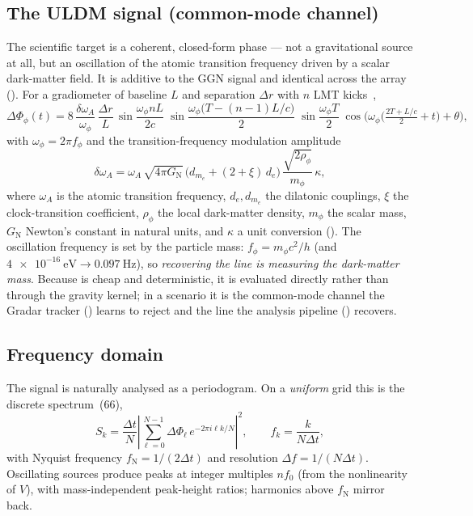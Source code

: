 \documentclass[11pt,a4paper]{article}
\theoremstyle{reqstyle}
\begin{document}
\subsection{The ULDM signal (common-mode channel)}
\label{sec:uldm}
The scientific target is a coherent, closed-form phase --- not a gravitational source at all,
but an oscillation of the atomic transition frequency driven by a scalar dark-matter field.
It is additive to the GGN signal and identical across the array (). For a
gradiometer of baseline $L$ and separation $\Delta r$ with $n$ LMT kicks~\cite{arvanitaki2015},
\begin{equation}
\Delta\Phi_\phi(t) = 8\,\frac{\delta\omega_A}{\omega_\phi}\,\frac{\Delta r}{L}\,
\sin\!\frac{\omega_\phi n L}{2c}\;
\sin\!\frac{\omega_\phi\big(T-(n{-}1)L/c\big)}{2}\;
\sin\!\frac{\omega_\phi T}{2}\;
\cos\!\Big(\omega_\phi\big(\tfrac{2T+L/c}{2}+t\big)+\theta\Big),
\label{eq:uldm}
\end{equation}
with $\omega_\phi = 2\pi f_\phi$ and the transition-frequency modulation amplitude
\begin{equation}
\delta\omega_A = \omega_A\,\sqrt{4\pi G_{\mathrm N}}\,
\big(d_{m_e} + (2+\xi)\,d_e\big)\,\frac{\sqrt{2\rho_\phi}}{m_\phi}\,\kappa,
\end{equation}
where $\omega_A$ is the atomic transition frequency, $d_e, d_{m_e}$ the dilatonic couplings,
$\xi$ the clock-transition coefficient, $\rho_\phi$ the local dark-matter density, $m_\phi$ the
scalar mass, $G_{\mathrm N}$ Newton's constant in natural units, and $\kappa$ a unit
conversion (). The oscillation frequency is set by the particle mass:
$f_\phi = m_\phi c^2/h$ (and $\SI{4e-16}{\electronvolt}\to\SI{0.097}{\hertz}$), so
\emph{recovering the line is measuring the dark-matter mass}. Because  is cheap
and deterministic, it is evaluated directly rather than through the gravity kernel; in a
scenario it is the common-mode channel the Gradar tracker () learns to reject
and the line the analysis pipeline () recovers.

\subsection{Frequency domain}
\label{sec:freq}
The signal is naturally analysed as a periodogram. On a \emph{uniform} grid this is the
discrete spectrum~(66),
\begin{equation}
S_k = \frac{\Delta t}{N}\left|\sum_{\ell=0}^{N-1}\Delta\Phi_\ell\,
e^{-2\pi i \ell k / N}\right|^2,
\qquad f_k = \frac{k}{N\Delta t},
\end{equation}
with Nyquist frequency $f_{\mathrm N} = 1/(2\Delta t)$ and resolution $\Delta f =
1/(N\Delta t)$. Oscillating sources produce peaks at integer multiples $n f_0$ (from the
nonlinearity of $V$), with mass-independent peak-height ratios; harmonics above $f_{\mathrm N}$
mirror back.
\end{document}
